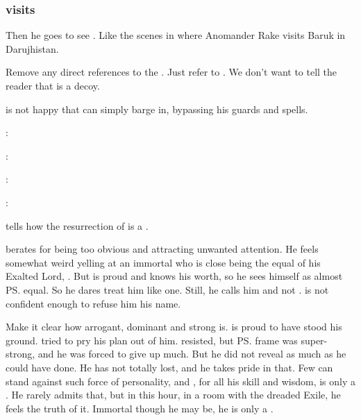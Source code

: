 \subsubsection{\Ishnaruchaefir visits \Psyrex}
Then he goes to see \Psyrex. 
Like the scenes in \cite{StevenErikson:GardensoftheMoon} where Anomander Rake visits Baruk in Darujhistan. 

Remove any direct references to the \Malcur \nexus. 
Just refer to . 
We don't want to tell the reader that \Forclin{} is a decoy. 

\Psyrex{} is not happy that \Ishnaruchaefir{} can simply barge in, bypassing his guards and spells. 

\begin{prose}
  \Ishnaruchaefir: 
  
  \Psyrex: 
  
  \Ishnaruchaefir: 
  
  \Psyrex: 
\end{prose}


\Psyrex{} tells how the resurrection of \Nithdornazsh{} is a .  

\Psyrex{} berates \Ishnaruchaefir{} for being too obvious and attracting unwanted attention. 
He feels somewhat weird yelling at an immortal who is close being the equal of his Exalted Lord, \Secherdamon. 
But \Psyrex{} is proud and knows his worth, so he sees himself as almost \ps{\Ishnaruchaefir} equal. 
So he dares treat him like one. 
Still, he calls him \quo{\Ishnaruchaefir} and not . 
\Psyrex{} is not confident enough to refuse him his name. 

Make it clear how arrogant, dominant and strong \QuessanthIshnaruchaefir{} is. 
\Psyrex{} is proud to have stood his ground. 
\Ishnaruchaefir{} tried to pry his plan out of him.
\Psyrex{} resisted, but \ps{\Ishnaruchaefir} frame was super-strong, and he was forced to give up much.
But he did not reveal as much as he could have done. 
He has not totally lost, and he takes pride in that. 
Few can stand against such force of personality, and \Psyrex, for all his skill and wisdom, is only a \scatha. 
He rarely admits that, but in this hour, in a room with the dreaded Exile, he feels the truth of it.
Immortal though he may be, he is only a \scatha. 

